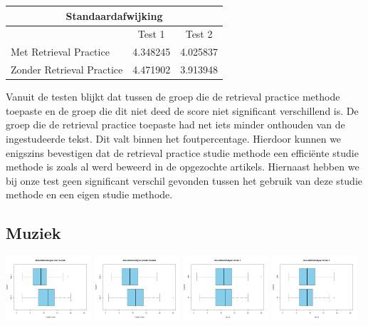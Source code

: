 \documentclass{hogent-article}
\begin{document}
	\begin{tabular}{ |p{10em}|c|c| }
	\hline
		\multicolumn{3}{|c|}{Standaardafwijking} \\
	\hline
		& Test 1 & Test 2 \\
	\hline
		Met Retrieval Practice & 4.348245 & 4.025837 \\
		Zonder Retrieval Practice & 4.471902 & 3.913948 \\
	\hline
	\end{tabular}
	
	Vanuit de testen blijkt dat tussen de groep die de retrieval practice methode toepaste en de groep die dit niet deed de score niet significant verschillend is. De groep die de retrieval practice toepaste had net iets minder onthouden van de ingestudeerde tekst. Dit valt binnen het foutpercentage. Hierdoor kunnen we enigszins bevestigen dat de retrieval practice studie methode een efficiënte studie methode is zoals al werd beweerd in de opgezochte artikels. Hiernaast hebben we bij onze test geen significant verschil gevonden tussen het gebruik van deze studie methode en een eigen studie methode.
	
	\subsection{Muziek}
	\includegraphics[width=120px]{Rplot_MetMuziek}	
	\includegraphics[width=120px]{Rplot_ZonderMuziek}
	\includegraphics[width=120px]{Rplot_Muziek_Score1}
	\includegraphics[width=120px]{Rplot_Muziek_Score2}
	
\end{document}
